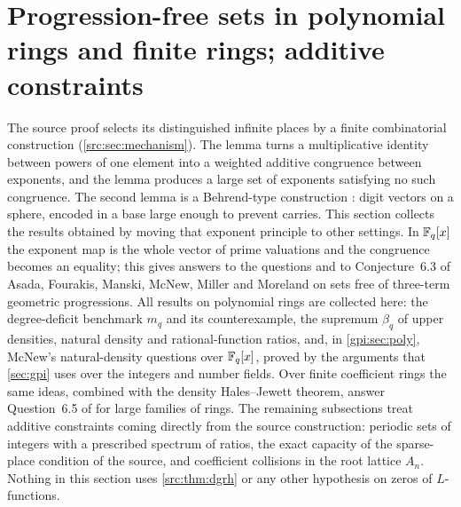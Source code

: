 \providecommand{\gpifile}[2][]{\begin{center}\footnotesize\artifact{#2}#1\end{center}}
\section[Progression-free sets in polynomial rings and finite rings]{Progression-free sets in polynomial rings and finite rings; additive constraints}\label{sec:gpp}

\providecommand{\gppA}{\mathcal{A}}
\providecommand{\gppG}{\mathcal{G}_q}
\providecommand{\gppP}{\mathcal{P}}
\providecommand{\gppPr}{\operatorname{Pr}}
\providecommand{\gppE}{\mathbb{E}}
\providecommand{\gppVar}{\operatorname{Var}}
\providecommand{\gppdens}{\operatorname{dens}}
\providecommand{\gpplc}{\operatorname{lc}}
\providecommand{\gppm}{\mathfrak{m}}
\providecommand{\gppsloppy}{\sloppy}
\providecommand{\gppB}{\mathcal{B}}

The source proof selects its distinguished infinite places by a finite combinatorial
construction (\cref{src:sec:mechanism}). The lemma
 turns a multiplicative identity between powers of one
element into a weighted additive congruence between exponents, and the lemma
 produces a large set of exponents satisfying no such
congruence. The second lemma is a Behrend-type construction \cite{Behrend1946Sets}: digit
vectors on a sphere, encoded in a base large enough to prevent carries. This section
collects the results obtained by moving that exponent principle to other settings. In
$\mathbb{F}_q[x]$ the exponent map is the whole vector of prime valuations and the congruence becomes
an equality; this gives answers to the questions and to Conjecture~6.3 of Asada, Fourakis,
Manski, McNew, Miller and Moreland \cite{Asada2017Subsets} on sets free of three-term
geometric progressions. All results on polynomial rings are collected here: the
degree-deficit benchmark $m_q$ and its counterexample, the supremum $\beta_q$ of upper
densities, natural density and rational-function ratios, and, in \cref{gpi:sec:poly},
McNew's natural-density questions over $\mathbb{F}_q[x]$, proved by the arguments that
\cref{sec:gpi} uses over the integers and number fields. Over finite coefficient rings the
same ideas, combined with the density Hales--Jewett theorem, answer Question~6.5 of
\cite{Asada2017Subsets} for large families of rings. The remaining subsections treat
additive constraints coming directly from the source construction: periodic sets of
integers with a prescribed spectrum of ratios, the exact capacity of the sparse-place
condition of the source, and coefficient collisions in the root lattice $A_n$. Nothing in
this section uses \cref{src:thm:dgrh} or any other hypothesis on zeros of $L$-functions.

